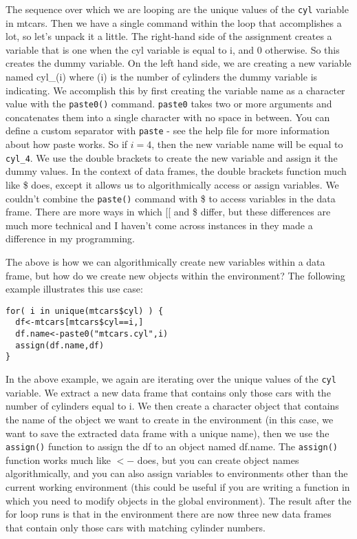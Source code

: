 \documentclass[12pt, oneside]{amsart}   	%
\begin{document}
The sequence over which we are looping are the unique values of the \texttt{cyl} variable in mtcars. Then we have a single command within the loop that accomplishes a lot, so let's unpack it a little. The right-hand side of the assignment creates a variable that is one when the cyl variable is equal to i, and 0 otherwise. So this creates the dummy variable. On the left hand side, we are creating a new variable named cyl\_(i) where (i) is the number of cylinders the dummy variable is indicating. We accomplish this by first creating the variable name as a character value with the \texttt{paste0()} command. \texttt{paste0} takes two or more arguments and concatenates them into a single character with no space in between. You can define a custom separator with \texttt{paste} - see the help file for more information about how paste works. So if $i=4$, then the new variable name will be equal to \texttt{cyl\_4}. We use the double brackets to create the new variable and assign it the dummy values. In the context of data frames, the double brackets function much like \$ does, except it allows us to algorithmically access or assign variables. We couldn't combine the \texttt{paste()} command with \$ to access variables in the data frame. There are more ways in which [[ and \$ differ, but these differences are much more technical and I haven't come across instances in they made a difference in my programming.   

The above is how we can algorithmically create new variables within a data frame, but how do we create new objects within the environment? The following example illustrates this use case:

\begin{verbatim}
for( i in unique(mtcars$cyl) ) {
  df<-mtcars[mtcars$cyl==i,]
  df.name<-paste0("mtcars.cyl",i)
  assign(df.name,df)
}
\end{verbatim}

In the above example, we again are iterating over the unique values of the \texttt{cyl} variable. We extract a new data frame that contains only those cars with the number of cylinders equal to i. We then create a character object that contains the name of the object we want to create in the environment (in this case, we want to save the extracted data frame with a unique name), then we use the \texttt{assign()} function to assign the df to an object named df.name. The \texttt{assign()} function works much like \texttt{$<-$} does, but you can create object names algorithmically, and you can also assign variables to environments other than the current working environment (this could be useful if you are writing a function in which you need to modify objects in the global environment). The result after the for loop runs is that in the environment there are now three new data frames that contain only those cars with matching cylinder numbers. 
\end{document}
